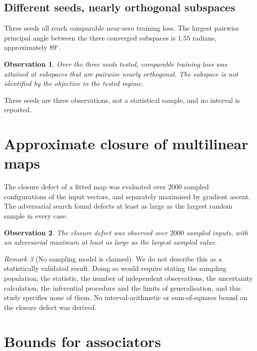 \documentclass[11pt]{amsart}
\newtheorem{observation}{Observation}[section]
\theoremstyle{remark}
\newtheorem{remark}[observation]{Remark}
\begin{document}
\subsection{Different seeds, nearly orthogonal subspaces}

Three seeds all reach comparable near-zero training loss. The largest pairwise principal
angle between the three converged subspaces is $1.55$ radians, approximately $89^{\circ}$.

\begin{observation}
\label{obs:identifiability}
Over the three seeds tested, comparable training loss was attained at subspaces that are
pairwise nearly orthogonal. The subspace is not identified by the objective in the tested
regime.
\end{observation}

Three seeds are three observations, not a statistical sample, and no interval is reported.

\section{Approximate closure of multilinear maps}
\label{sec:closure}

The closure defect of a fitted map was evaluated over $2000$ sampled configurations of the
input vectors, and separately maximised by gradient ascent. The adversarial search found
defects at least as large as the largest random sample in every case.

\begin{observation}
\label{obs:closure}
The closure defect was observed over $2000$ sampled inputs, with an adversarial maximum at
least as large as the largest sampled value.
\end{observation}

\begin{remark}[No sampling model is claimed]
\label{rem:nosampling}
We do not describe this as a statistically validated result. Doing so would require stating
the sampling population, the statistic, the number of independent observations, the
uncertainty calculation, the inferential procedure and the limits of generalisation, and
this study specifies none of them. No interval-arithmetic or sum-of-squares bound on the
closure defect was derived.
\end{remark}

\section{Bounds for associators}
\label{sec:associator}
\end{document}
